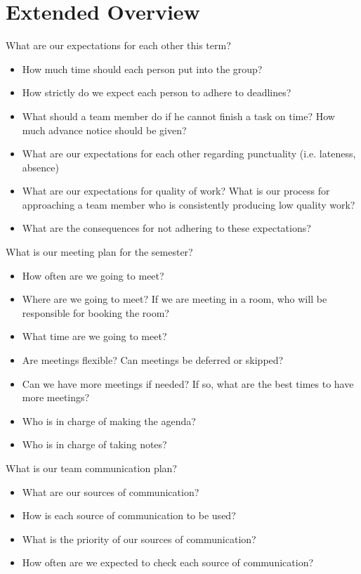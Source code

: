 \documentclass[11pt]{meetingmins}
\begin{document}
\section{Extended Overview}
\begin{hiddenitems}
\item
What are our expectations for each other this term?
\begin{itemize}
	\item{How much time should each person put into the group?}
	\item{How strictly do we expect each person to adhere to deadlines?}
	\item{What should a team member do if he cannot finish a task on time? How much 
advance
	      notice should be given?}
	\item{What are our expectations for each other regarding punctuality (i.e. 
lateness, absence)}
	\item{What are our expectations for quality of work? What is our process for 
approaching a
	      team member who is consistently producing low quality work?}
	\item{What are the consequences for not adhering to these expectations?}
\end{itemize}

\item
What is our meeting plan for the semester?
\begin{itemize}
	\item{How often are we going to meet?}
	\item{Where are we going to meet? If we are meeting in a room, who will be 
responsible for
	      booking the room?}
	\item{What time are we going to meet?}
	\item{Are meetings flexible? Can meetings be deferred or skipped?}
	\item{Can we have more meetings if needed? If so, what are the best times to 
have more
	      meetings?}
	\item{Who is in charge of making the agenda?}
	\item{Who is in charge of taking notes?}
	
\end{itemize}

\item
What is our team communication plan?
\begin{itemize}
	\item{What are our sources of communication?}
	\item{How is each source of communication to be used?}
	\item{What is the priority of our sources of communication?}
	\item{How often are we expected to check each source of communication?}
\end{itemize}


\end{hiddenitems}
\end{document}
